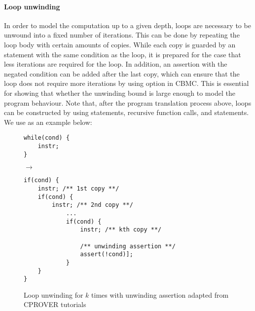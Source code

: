 \paragraph{Loop unwinding} In order to model the computation up to a given depth, loops are necessary to be unwound into a fixed number of iterations. This can be done by repeating the loop body with certain amounts of copies. While each copy is guarded by an  statement with the same condition as the loop, it is prepared for the case that less iterations are required for the loop. In addition, an assertion with the negated condition can be added after the last copy, which can ensure that the loop does not require more iterations by using  option in CBMC. This
is essential for showing that whether the unwinding bound is large enough to model the program behaviour. Note that, after the program translation process above, loops can be constructed by using  statements, recursive function calls, and  statements. We use  as an example below: 


\begin{figure}[H]
\centering
{
\begin{minipage}{.2\textwidth}
\begin{verbatim}
while(cond) {
    instr;
}    
\end{verbatim}
\end{minipage}
\begin{minipage}[]{.05\textwidth}
$\to$
\end{minipage}
\begin{minipage}[]{.5\textwidth}
\begin{verbatim}
if(cond) {
    instr; /** 1st copy **/
    if(cond) {
        instr; /** 2nd copy **/
            ...
            if(cond) {
                instr; /** kth copy **/
                
                /** unwinding assertion **/
                assert(!cond)]; 
            }
    }
}    
\end{verbatim}
\end{minipage}
}
\caption[The LOF caption]{Loop unwinding for $k$ times with unwinding assertion adapted from CPROVER tutorials \protect\footnotemark}
\end{figure}

